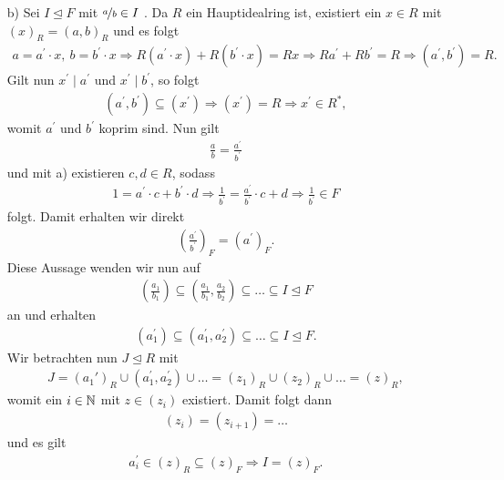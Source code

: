 \begin{loes}
\begin{enumerate}
		\item[b)]
		Sei $ I \unlhd F $ mit $ \nicefrac{a}{b}  \in I$ .
		Da $ R $ ein Hauptidealring ist, existiert ein $ x \in R $ mit
		$ (x)_R  =(a,b)_R$ und es folgt
		\begin{align*}
		a = a^\prime \cdot x, \ b = b^\prime \cdot x
		\Rightarrow
		R (a^\prime \cdot x) +R (b^\prime \cdot x) = R x
		\Rightarrow
		R a^\prime + R b^\prime = R
		\Rightarrow
		(a^\prime, b^\prime) = R.
		\end{align*}
		Gilt nun $ x^\prime \mid a^\prime $ und $ x^\prime \mid b^\prime $,
		so folgt
		\begin{align*}
		(a^\prime, b^\prime) \subseteq (x^\prime)
		\Rightarrow 
		(x^\prime) = R
		\Rightarrow
		x^\prime \in R^\ast,
		\end{align*}
		womit $ a^\prime $ und $ b^\prime $ koprim sind.
		Nun gilt 
		\begin{align*}
		\frac{a}{b} = \frac{a^\prime}{b^\prime}
		\end{align*}
		und mit a) existieren $ c,d \in R $, sodass
		\begin{align*}
		1 = a^\prime \cdot c + b^\prime \cdot d
		\Rightarrow
		\frac{1}{b^\prime} = \frac{a^\prime}{b^\prime} \cdot c + d
		\Rightarrow
		\frac{1}{b^\prime} \in F
		\end{align*}
		folgt.
		Damit erhalten wir direkt
		\begin{align*}
		\left(\frac{a^\prime}{b^\prime}\right)_F = (a^\prime)_F.
		\end{align*}
		Diese Aussage wenden wir nun auf
		\begin{align*}
		\left(\frac{a_1}{b_1}\right) 
		\subseteq
		\left(\frac{a_1}{b_1}, \frac{a_2}{b_2}\right) 
		\subseteq
		\dots
		\subseteq
		I \unlhd F
		\end{align*}
		an und erhalten
		\begin{align*}
		(a_1^\prime) 
		\subseteq
		(a_1^\prime, a_2^\prime)
		\subseteq
		\dots
		\subseteq
		I \unlhd F.
		\end{align*}
		Wir betrachten nun $ J \unlhd R $ mit
		\begin{align*}
		J = (a_1\prime)_R \cup (a_1^\prime,a_2^\prime)\cup \dots
		=(z_1)_R \cup (z_2)_R \cup \dots = (z)_R,
		\end{align*}
		womit ein $ i \in \mathbb{N} $ mit $ z \in (z_i) $ existiert.
		Damit folgt dann
		\begin{align*}
		(z_i) = (z_{i+1}) = \dots
		\end{align*}
		und es gilt
		\begin{align*}
		a_i^\prime \in (z)_R \subseteq (z)_F
		\Rightarrow 
		I = (z)_F.
		\end{align*}
	\end{enumerate}
\end{loes}